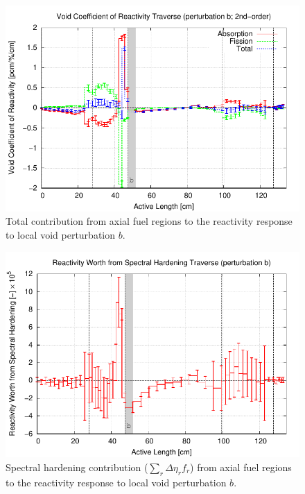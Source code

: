 \documentclass[11pt]{article}
\begin{document}
\clearpage
\begin{figure}[p]
  \centering
  \includegraphics[width=\textwidth, trim=0 0 0 0.275in, clip]{./img/AC-TraverseAlpha2.pdf}
  \caption{Total contribution from axial fuel regions to the reactivity response to local void perturbation $b$.}
  \label{fig:alphaAc}
\end{figure}

\clearpage
\begin{figure}[p]
  \centering
  \includegraphics[width=\textwidth, trim=0 0 0 0.275in, clip]{./img/AC-TraverseDeltaEtaEff.pdf}
  \caption{Spectral hardening contribution ($\sum_r{\Delta\eta_r f_r}$) from axial fuel regions to the reactivity response to local void perturbation $b$.}
  \label{fig:spectralAc}
\end{figure}
\end{document}
